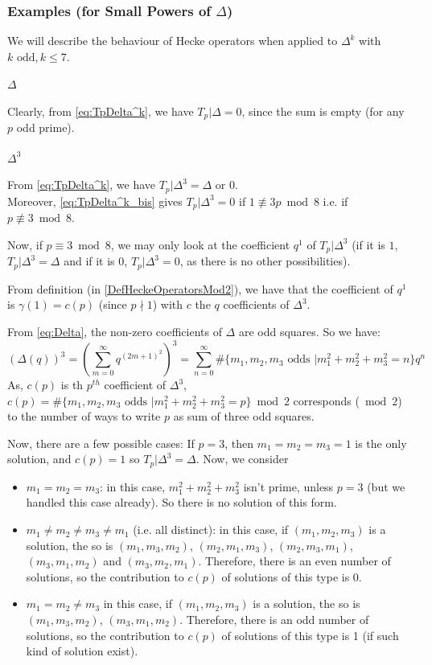 \subsubsection{Examples (for Small Powers of $\Delta$)}
We will describe the behaviour of Hecke operators when applied to $\Delta^k$ with $k \text{ odd}, k \leq 7$.

\paragraph{$\Delta$}
Clearly, from \eqref{eq:TpDelta^k}, we have $T_p|\Delta = 0$, since the sum is empty (for any $p$ odd prime).

\paragraph{$\Delta^3$}
From \eqref{eq:TpDelta^k}, we have $T_p|\Delta^3 = \Delta \text{ or } 0$.\\
Moreover, \eqref{eq:TpDelta^k_bis} gives $T_p|\Delta^3 = 0$ if $1 \not\equiv 3p \bmod 8$ i.e. if $p \not\equiv 3 \bmod 8$.

Now, if $p \equiv 3 \bmod 8$, we may only look at the coefficient $q^1$ of $T_p|\Delta^3$ (if it is $1$, $T_p|\Delta^3 = \Delta$ and if it is $0$, $T_p|\Delta^3 = 0$, as there is no other possibilities).

From definition (in \ref{DefHeckeOperatorsMod2}), we have that the coefficient of $q^1$ is $\gamma(1) = c(p)$ (since $p \nmid 1$) with $c$ the $q$ coefficients of $\Delta^3$.

From \eqref{eq:Delta}, the non-zero coefficients of $\Delta$ are odd squares.
So we have:
$$
\left( \Delta(q) \right)^3
= \left( \sum_{m=0}^{\infty} q^{(2m+1)^2} \right)^3
= \sum_{n=0}^{\infty} \#\{m_1, m_2, m_3 \text{ odds } | m_1^2 + m_2^2 + m_3^2 = n\} q^n
$$
As, $c(p)$ is th $p^{th}$ coefficient of $\Delta^3$, $c(p) = \#\{m_1, m_2, m_3 \text{ odds } | m_1^2 + m_2^2 + m_3^2 = p\} \bmod 2$ corresponds ($\bmod 2$) to the number of ways to write $p$ as sum of three odd squares.

Now, there are a few possible cases:
If $p=3$, then $m_1=m_2=m_3=1$ is the only solution, and $c(p)=1$ so $T_p|\Delta^3=\Delta$.
Now, we consider 
\begin{itemize}
	\item $m_1=m_2=m_3$: in this case, $m_1^2 + m_2^2 + m_3^2$ isn't prime, unless $p=3$ (but we handled this case already). So there is no solution of this form.
	\item $m_1 \neq m_2 \neq m_3 \neq m_1$ (i.e. all distinct): in this case, if $(m_1, m_2, m_3)$ is a solution, the so is $(m_1, m_3, m_2)$, $(m_2, m_1, m_3)$, $(m_2, m_3, m_1)$, $(m_3, m_1, m_2)$ and $(m_3, m_2, m_1)$. Therefore, there is an even number of solutions, so the contribution to $c(p)$ of solutions of this type is 0.
	\item $m_1 = m_2\neq m_3$ in this case, if $(m_1, m_2, m_3)$ is a solution, the so is $(m_1, m_3, m_2)$, $(m_3, m_1, m_2)$. Therefore, there is an odd number of solutions, so the contribution to $c(p)$ of solutions of this type is 1 (if such kind of solution exist).
\end{itemize}

